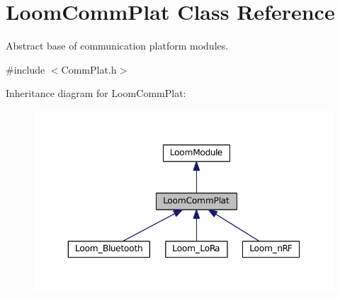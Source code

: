 \hypertarget{class_loom_comm_plat}{}\section{Loom\+Comm\+Plat Class Reference}
\label{class_loom_comm_plat}


Abstract base of communication platform modules.  




{\ttfamily \#include $<$Comm\+Plat.\+h$>$}



Inheritance diagram for Loom\+Comm\+Plat\+:\nopagebreak
\begin{figure}[H]
\begin{center}
\leavevmode
\includegraphics[width=350pt]{class_loom_comm_plat__inherit__graph}
\end{center}
\end{figure}
